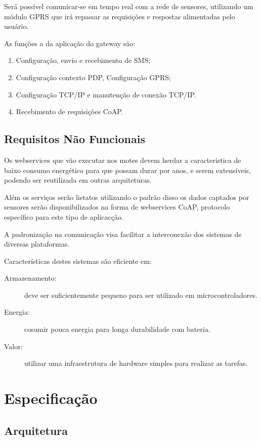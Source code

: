 Ser\'a poss\'ivel comunicar-se em tempo real com a rede de sensores, utilizando um m\'odulo GPRS que ir\'a repassar as requisi\c{c}\~oes e respostas alimentadas pelo usu\'ario.

As fun\c{c}\~oes a da aplica\c{c}\~ao do gateway s\~ao:
\begin{enumerate}
    \item Configura\c{c}\~ao, envio e recebimento de SMS;
    \item Configura\c{c}\~ao contexto PDP, Configura\c{c}\~ao GPRS;
    \item Configura\c{c}\~ao TCP/IP e manuten\c{c}\~ao de conex\~ao TCP/IP.
    \item Recebimento de requisi\c{c}\~oes CoAP.
\end{enumerate}

\subsection{Requisitos N\~ao Funcionais}

Os webservices que v\~ao executar nos motes devem herdar a caracteristica de baixo consumo energ\'etico para que possam durar por anos, e serem extens\'iveis, podendo ser reutilizada em outras arquiteturas.

Al\'em os servi\c{c}os ser\~ao listatos utilizando o padr\~ao \cite{rfc6690} disso os dados captados por sensores ser\~ao disponibilizados na forma de webservices CoAP, protocolo espec\'ifico para este tipo de aplicac\c{c}\~ao.

A padroniza\c{c}\~ao na comunica\c{c}\~ao visa facilitar a interconex\~ao dos sistemas de diversas plataformas.

Caracter\'isticas destes sistemas s\~ao eficiente em:
\begin{description}
\item[Armazenamento:] deve ser suficientemente pequeno para ser utilizado em microcontroladores.
\item[Energia:] cosumir pouca energia para longa durabilidade com bateria.
\item[Valor:] utilizar uma infraestrutura de hardware simples para realizar as tarefas.
\end{description}

\section{Especifica\c{c}\~ao}
\subsection{Arquitetura}

